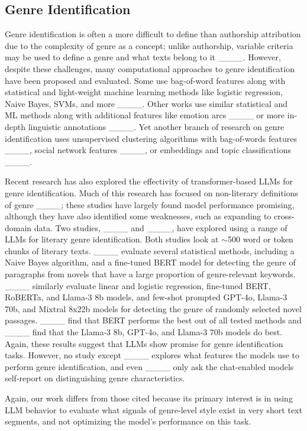 \subsection{Genre Identification}

Genre identification is often a more difficult to define than authorship attribution due to the complexity of genre as a concept; unlike authorship, variable criteria may be used to define a genre and what texts belong to it ____. However, despite these challenges, many computational approaches to genre identification have been proposed and evaluated. Some use bag-of-word features along with statistical and light-weight machine learning methods like logistic regression, Naive Bayes, SVMs, and more ____. Other works use similar statistical and ML methods along with additional features like emotion arcs ____ or more in-depth linguistic annotations ____. Yet another branch of research on genre identification uses unsupervised clustering algorithms with bag-of-words features ____, social network features ____, or embeddings and topic classifications ____.

Recent research has also explored the effectivity of transformer-based LLMs for genre identification. Much of this research has focused on non-literary definitions of genre ____; these studies have largely found model performance promising, although they have also identified some weaknesses, such as expanding to cross-domain data. Two studies, ____ and ____, have explored using a range of LLMs for literary genre identification. Both studies look at $\sim$500 word or token chunks of literary texts. ____ evaluate several statistical methods, including a Naive Bayes algorithm, and a fine-tuned BERT model for detecting the genre of paragraphs from novels that have a large proportion of genre-relevant keywords. ____ similarly evaluate linear and logistic regression, fine-tuned BERT, RoBERTa, and Llama-3 8b models, and few-shot prompted GPT-4o, Llama-3 70b, and Mixtral 8x22b models for detecting the genre of randomly selected novel passages. ____ find that BERT performs the best out of all tested methods and ____ find that the Llama-3 8b, GPT-4o, and Llama-3 70b models do best. Again, these results suggest that LLMs show promise for genre identification tasks. However, no study except ____ explores what features the models use to perform genre identification, and even ____ only ask the chat-enabled models self-report on distinguishing genre characteristics.

Again, our work differs from those cited because its primary interest is in using LLM behavior to evaluate what signals of genre-level style exist in very short text segments, and not optimizing the model's performance on this task.